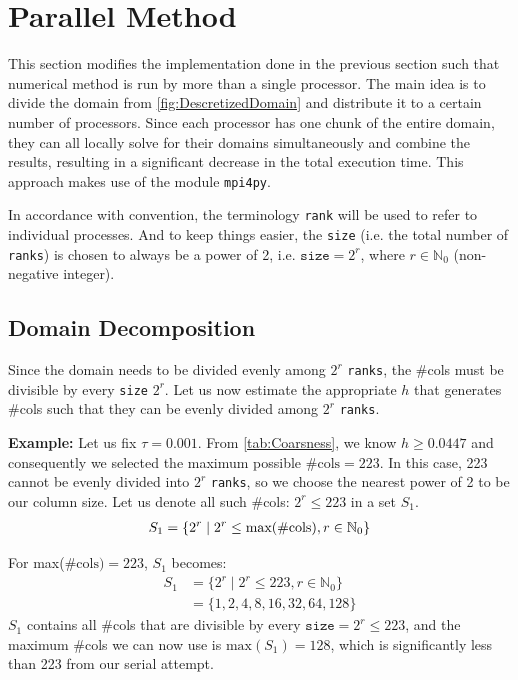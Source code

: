 \section{Parallel Method}
This section modifies the implementation done in the previous section such that numerical method is run by more than a single processor. The main idea is to divide the domain from \autoref{fig:DescretizedDomain} and distribute it to a certain number of processors. Since each processor has one chunk of the entire domain, they can all locally solve for their domains simultaneously and combine the results, resulting in a significant decrease in the total execution time. This approach makes use of the module \texttt{mpi4py}.

In accordance with convention, the terminology \texttt{rank} will be used to refer to individual processes. And to keep things easier, the \texttt{size} (i.e. the total number of \texttt{ranks}) is chosen to always be a power of 2, i.e. $\texttt{size}= 2^r$, where $ r\in \mathbb{N}_{0}$ (non-negative integer).

\subsection{Domain Decomposition}
Since the domain needs to be divided evenly among $2^r$ \texttt{ranks}, the \#cols must be divisible by every \texttt{size} $2^r$. Let us now estimate the appropriate $h$ that generates \#cols such that they can be evenly divided among $2^r$ \texttt{ranks}.

\textbf{Example:} Let us fix  $\tau=0.001$. From \autoref{tab:Coarsness}, we know $h\geq0.0447$ and consequently we selected the maximum possible $\#\text{cols}=223$. In this case, 223 cannot be evenly divided into $2^r$ \texttt{ranks}, so we choose the nearest power of 2 to be our column size. Let us denote all such \#cols: $2^r \leq 223$ in a set $S_1$.
\begin{equation}
    \begin{aligned}
S_1 = \{2^r \mid 2^r \leq \text{max(\#\text{cols})}, r \in \mathbb{N}_{0} \}
    \end{aligned}
\end{equation}

For max($\#\text{cols})=223$, $S_1$ becomes:
\begin{equation}
    \begin{aligned}
        S_1 &= \{2^r \mid 2^r \leq 223, r \in \mathbb{N}_{0} \}  \\ 
        &= \{ 1,2,4,8,16,32,64,128 \} 
    \end{aligned}
    \label{eq:ddt31}
\end{equation}
$S_1$ contains all \#cols that are divisible by every $\texttt{size}=2^r\leq223$, and the maximum \#cols we can now use is $\text{max}(S_1) = 128$, which is significantly less than 223 from our serial attempt.

